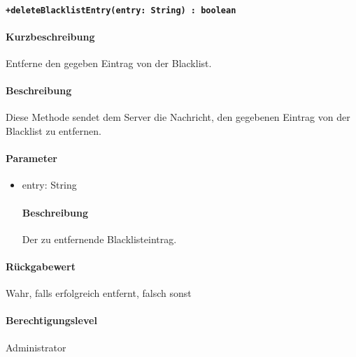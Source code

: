 \paragraph{\texttt{+deleteBlacklistEntry(entry: String) : boolean}}%
\paragraph*{Kurzbeschreibung}
Entferne den gegeben Eintrag von der Blacklist.
\paragraph*{Beschreibung}
Diese Methode sendet dem Server die Nachricht, den gegebenen Eintrag von der Blacklist zu entfernen.
\paragraph*{Parameter}
\begin{itemize}
    \item entry: String
            \paragraph*{Beschreibung}
            Der zu entfernende Blacklisteintrag.
\end{itemize}
\paragraph*{Rückgabewert}
Wahr, falls erfolgreich entfernt, falsch sonst
\paragraph*{Berechtigungslevel}
Administrator